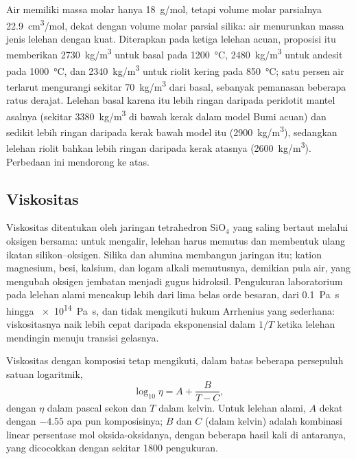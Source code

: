 Air memiliki massa molar hanya \qty{18}{g/mol}, tetapi volume molar parsialnya
\qty{22.9}{cm^3/mol}, dekat dengan volume molar parsial silika: air menurunkan massa jenis lelehan
dengan kuat. Diterapkan pada ketiga lelehan acuan, proposisi itu memberikan
\qty{2730}{kg/m^3} untuk basal pada \qty{1200}{\celsius}, \qty{2480}{kg/m^3} untuk
andesit pada \qty{1000}{\celsius}, dan \qty{2340}{kg/m^3} untuk riolit kering
pada \qty{850}{\celsius}; satu persen air terlarut mengurangi sekitar
\qty{70}{kg/m^3} dari basal, sebanyak pemanasan beberapa ratus derajat.
Lelehan basal karena itu lebih ringan daripada peridotit mantel asalnya
(sekitar \qty{3380}{kg/m^3} di bawah kerak dalam model Bumi acuan) dan sedikit
lebih ringan daripada kerak bawah model itu (\qty{2900}{kg/m^3}), sedangkan
lelehan riolit bahkan lebih ringan daripada kerak atasnya (\qty{2600}{kg/m^3}). Perbedaan ini mendorong 
ke atas.

\subsection{Viskositas}

Viskositas  ditentukan oleh jaringan tetrahedron SiO$_4$ yang
saling bertaut melalui oksigen bersama: untuk mengalir, lelehan harus memutus dan membentuk ulang
ikatan silikon--oksigen. Silika dan alumina membangun jaringan itu; kation
magnesium, besi, kalsium, dan logam alkali memutusnya, demikian pula air, yang
mengubah oksigen jembatan menjadi gugus hidroksil. Pengukuran laboratorium pada lelehan
alami mencakup lebih dari lima belas orde besaran, dari \qty{0.1}{Pa.s} hingga
\qty{e14}{Pa.s}, dan tidak mengikuti hukum Arrhenius yang sederhana: viskositasnya
naik lebih cepat daripada eksponensial dalam $1/T$ ketika lelehan mendingin menuju transisi
gelasnya.

\begin{proposition}\label{prop:b2:magma-emplacement:vft}
Viskositas  dengan komposisi tetap mengikuti, dalam batas beberapa
persepuluh satuan logaritmik,
\[
\log_{10}\eta = A + \frac{B}{T - C},
\]
dengan $\eta$ dalam pascal sekon dan $T$ dalam kelvin. Untuk lelehan alami, $A$ dekat dengan
$-4.55$ apa pun komposisinya; $B$ dan $C$ (dalam kelvin) adalah kombinasi
linear persentase mol oksida-oksidanya, dengan beberapa hasil kali di antaranya,
yang dicocokkan dengan sekitar \num{1800} pengukuran.
\end{proposition}
\admitted


